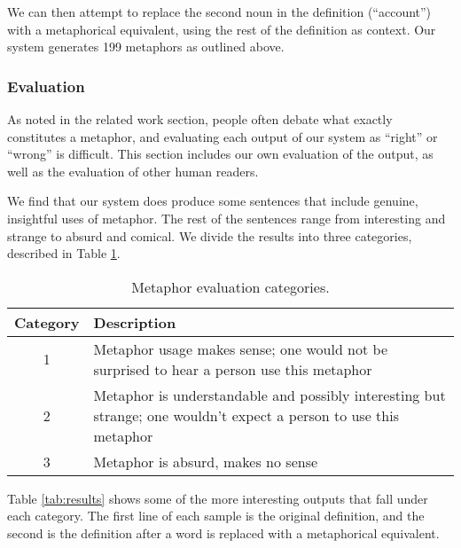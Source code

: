 \documentclass[12pt]{article}
\begin{document}
We can then attempt to replace the second noun in the definition (``account'') with a metaphorical equivalent, using the rest of the definition as context. Our system generates 199 metaphors as outlined above.

\subsubsection{Evaluation}

As noted in the related work section, people often debate what exactly constitutes a metaphor, and evaluating each output of our system as ``right'' or ``wrong'' is difficult. This section includes our own evaluation of the output, as well as the evaluation of other human readers.

We find that our system does produce some sentences that include genuine, insightful uses of metaphor. The rest of the sentences range from interesting and strange to absurd and comical. We divide the results into three categories, described in Table \ref{tab:evalcats}.

\begin{table}[h]
	\centering
	\small
	\begin{tabular}{|c|p{10cm}|} \hline
		\textbf{Category} & \textbf{Description}\\ \hline
		1 & Metaphor usage makes sense; one would not be surprised to hear a person use this metaphor\\ \hline
        2 & Metaphor is understandable and possibly interesting but strange; one wouldn’t expect a person to use this metaphor\\ \hline
		3 & Metaphor is absurd, makes no sense\\ \hline
	\end{tabular}
	\caption{Metaphor evaluation categories.}
	\label{tab:evalcats}
\end{table}

Table \ref{tab:results} shows some of the more interesting outputs that fall under each category. The first line of each sample is the original definition, and the second is the definition after a word is replaced with a metaphorical equivalent.
\end{document}
